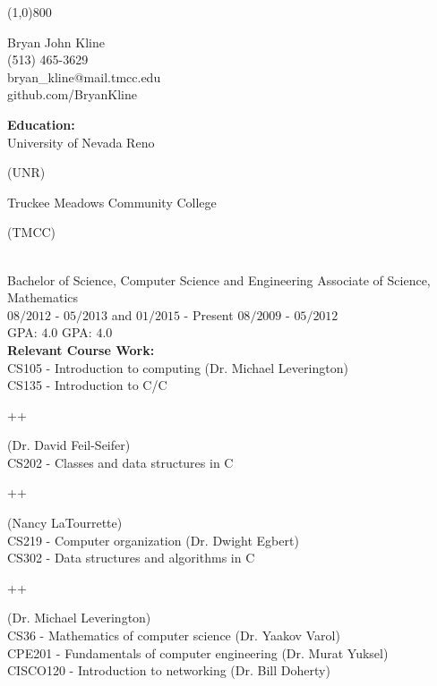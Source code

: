 \documentclass[8pt]{paper}
\begin{document}
\line(1,0){800}

\begin{flushright}
Bryan John Kline\\
(513) 465-3629\\
bryan\_kline@mail.tmcc.edu\\
github.com/BryanKline\\
\end{flushright}

\begin{flushleft}
\large{\bfseries{Education:}}\\
[2mm]

University of Nevada Reno \begin{small}
(UNR)
\end{small} \hspace{52.5mm}Truckee Meadows Community College \begin{small}(TMCC)\end{small}\\
Bachelor of Science, Computer Science and Engineering \hspace{12.5mm} Associate of Science, Mathematics\\
$08/2012$ - $05/2013$ and $01/2015$ - Present \hspace{39mm} $08/2009$ - $05/2012$\\
GPA: $4.0$ \hspace{97mm} GPA: $4.0$\\
[2mm]

\large{\bfseries{Relevant Course Work:}}\\
[2mm]

CS105 \hspace{6mm} - Introduction to computing (Dr. Michael Leverington)\\
CS135 \hspace{6mm} - Introduction to C/C\begin{small}++\end{small} (Dr. David Feil-Seifer)\\
CS202 \hspace{6mm} - Classes and data structures in C\begin{small}++\end{small} (Nancy LaTourrette)\\
CS219 \hspace{6mm} - Computer organization (Dr. Dwight Egbert)\\
CS302 \hspace{6mm} - Data structures and algorithms in C\begin{small}++\end{small} (Dr. Michael Leverington)\\
CS36 \hspace{8mm} - Mathematics of computer science (Dr. Yaakov Varol)\\
CPE201 \hspace{3mm} - Fundamentals of computer engineering (Dr. Murat Yuksel)\\
CISCO120 - Introduction to networking (Dr. Bill Doherty)\\
	

\end{flushleft}
\end{document}
